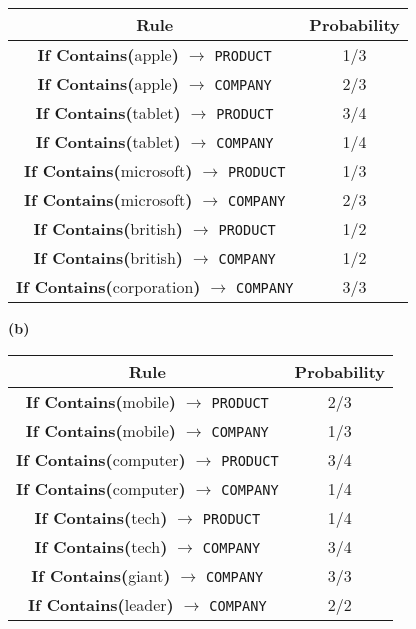 \documentclass[11pt]{article}
\renewcommand\part[1]{\vspace{.10in}\textbf{(#1)}}
\begin{document}
 \begin{table}[H]
\centering
{\renewcommand{\arraystretch}{1.4}%
\begin{tabular}{| c | c |}
\hline
\textbf{Rule} & \textbf{Probability}\\
\hline
\textbf{If Contains(}apple\textbf{)} $\rightarrow$ {\tt PRODUCT} & 1/3\\ \hline
\textbf{If Contains(}apple\textbf{)} $\rightarrow$ {\tt COMPANY} & 2/3\\ \hline
\textbf{If Contains(}tablet\textbf{)} $\rightarrow$ {\tt PRODUCT} & 3/4\\ \hline
\textbf{If Contains(}tablet\textbf{)} $\rightarrow$ {\tt COMPANY} & 1/4\\ \hline
\textbf{If Contains(}microsoft\textbf{)} $\rightarrow$ {\tt PRODUCT} & 1/3\\ \hline
\textbf{If Contains(}microsoft\textbf{)} $\rightarrow$ {\tt COMPANY} & 2/3\\ \hline
\textbf{If Contains(}british\textbf{)} $\rightarrow$ {\tt PRODUCT} & 1/2\\ \hline
\textbf{If Contains(}british\textbf{)} $\rightarrow$ {\tt COMPANY} & 1/2\\ \hline
\textbf{If Contains(}corporation\textbf{)} $\rightarrow$ {\tt COMPANY} & 3/3\\ \hline
\end{tabular}}
\end{table}

\part{b}

 \begin{table}[H]
\centering
{\renewcommand{\arraystretch}{1.4}%
\begin{tabular}{| c | c |}
\hline
\textbf{Rule} & \textbf{Probability}\\
\hline
\textbf{If Contains(}mobile\textbf{)} $\rightarrow$ {\tt PRODUCT} & 2/3\\ \hline
\textbf{If Contains(}mobile\textbf{)} $\rightarrow$ {\tt COMPANY} & 1/3\\ \hline
\textbf{If Contains(}computer\textbf{)} $\rightarrow$ {\tt PRODUCT} & 3/4\\ \hline
\textbf{If Contains(}computer\textbf{)} $\rightarrow$ {\tt COMPANY} & 1/4\\ \hline
\textbf{If Contains(}tech\textbf{)} $\rightarrow$ {\tt PRODUCT} & 1/4\\ \hline
\textbf{If Contains(}tech\textbf{)} $\rightarrow$ {\tt COMPANY} & 3/4\\ \hline
\textbf{If Contains(}giant\textbf{)} $\rightarrow$ {\tt COMPANY} & 3/3\\ \hline
\textbf{If Contains(}leader\textbf{)} $\rightarrow$ {\tt COMPANY} & 2/2\\ \hline
\end{tabular}}
\end{table}
\end{document}
